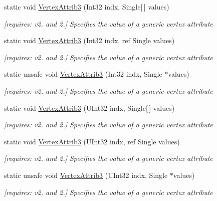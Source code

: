 \begin{DoxyCompactItemize}
static void \hyperlink{class_open_t_k_1_1_graphics_1_1_e_s20_1_1_g_l_a7e3b5c7ce07e6703ed1ba12123e11407}{Vertex\-Attrib3} (Int32 indx, Single\mbox{[}$\,$\mbox{]} values)
\begin{DoxyCompactList}\small\item\em \mbox{[}requires\-: v2. and 2.\mbox{]} Specifies the value of a generic vertex attribute \end{DoxyCompactList}\item 
static void \hyperlink{class_open_t_k_1_1_graphics_1_1_e_s20_1_1_g_l_a2d0ade57a0f2ef08f1e53cf98fa9a216}{Vertex\-Attrib3} (Int32 indx, ref Single values)
\begin{DoxyCompactList}\small\item\em \mbox{[}requires\-: v2. and 2.\mbox{]} Specifies the value of a generic vertex attribute \end{DoxyCompactList}\item 
static unsafe void \hyperlink{class_open_t_k_1_1_graphics_1_1_e_s20_1_1_g_l_a0c9d2cceb72d426ea04261659de8393d}{Vertex\-Attrib3} (Int32 indx, Single $\ast$values)
\begin{DoxyCompactList}\small\item\em \mbox{[}requires\-: v2. and 2.\mbox{]} Specifies the value of a generic vertex attribute \end{DoxyCompactList}\item 
static void \hyperlink{class_open_t_k_1_1_graphics_1_1_e_s20_1_1_g_l_ae4c5a0807336462d25fc3d443440c01f}{Vertex\-Attrib3} (U\-Int32 indx, Single\mbox{[}$\,$\mbox{]} values)
\begin{DoxyCompactList}\small\item\em \mbox{[}requires\-: v2. and 2.\mbox{]} Specifies the value of a generic vertex attribute \end{DoxyCompactList}\item 
static void \hyperlink{class_open_t_k_1_1_graphics_1_1_e_s20_1_1_g_l_af3d0bed569fae03f6cf3de8ab8237673}{Vertex\-Attrib3} (U\-Int32 indx, ref Single values)
\begin{DoxyCompactList}\small\item\em \mbox{[}requires\-: v2. and 2.\mbox{]} Specifies the value of a generic vertex attribute \end{DoxyCompactList}\item 
static unsafe void \hyperlink{class_open_t_k_1_1_graphics_1_1_e_s20_1_1_g_l_a4889e33941ce03cef6a54423deb6e089}{Vertex\-Attrib3} (U\-Int32 indx, Single $\ast$values)
\begin{DoxyCompactList}\small\item\em \mbox{[}requires\-: v2. and 2.\mbox{]} Specifies the value of a generic vertex attribute \end{DoxyCompactList}\item 

\end{DoxyCompactItemize}
